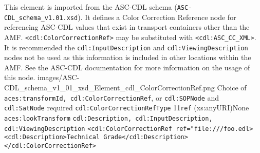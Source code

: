         {This element is imported from the ASC-CDL schema (\texttt{ASC-CDL\_schema\_v1.01.xsd}).  It defines a Color Correction Reference node for referencing ASC-CDL values that exist in transport containers other than the AMF.  \texttt{<cdl:ColorCorrectionRef>} may be substituted with \texttt{<cdl:ASC\_CC\_XML>}.  It is recommended the \texttt{cdl:InputDescription} and \texttt{cdl:ViewingDescription} nodes not be used as this information is included in other locations within the AMF.  See the ASC-CDL documentation for more information on the usage of this node.}
        {images/ASC-CDL_schema_v1_01_xsd_Element_cdl_ColorCorrectionRef.png}
        {Choice of \texttt{aces:transformId, cdl:ColorCorrectionRef}, or \texttt{cdl:SOPNode} and \\ \texttt{cdl:SatNode} required}
        {\texttt{cdl:ColorCorrectionRefType}}
        {1}{1}{\texttt{ref} (xs:anyURI)}{None}
        {\texttt{aces:lookTransform}}
        {\texttt{cdl:Description, cdl:InputDescription, cdl:ViewingDescription}}
        {\lstinline{<cdl:ColorCorrectionRef ref="file:///foo.edl>}\\
                    \lstinline{<cdl:Description>Technical Grade</cdl:Description>}\\
                    \lstinline{</cdl:ColorCorrectionRef>}}










